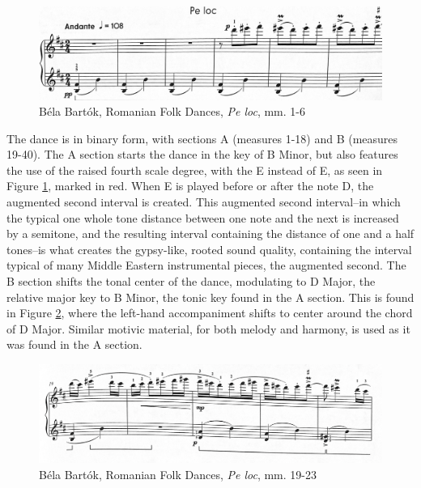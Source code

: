 \begin{figure}[h]
  \centering
  \includegraphics[width=\textwidth]{figures/bartok-one-spot-beginning.jpg}
  \caption{Béla Bartók, Romanian Folk Dances, \textit{Pe loc}, mm. 1-6}
  \label{fig:bartok-one-spot-beginning}
\end{figure}

The dance is in binary form, with sections A (measures 1-18) and B (measures 19-40). The A section starts the dance in the key of B Minor, but also features the use of the raised fourth scale degree, with the E\musSharp{} instead of E, as seen in Figure \ref{fig:bartok-one-spot-beginning}\autocite{Lung_2016}, marked in red. When E\musSharp{} is played before or after the note D, the augmented second interval is created. This augmented second interval--in which the typical one whole tone distance between one note and the next is increased by a semitone, and the resulting interval containing the distance of one and a half tones--is what creates the gypsy-like, rooted sound quality, containing the interval typical of many Middle Eastern instrumental pieces, the augmented second. The B section shifts the tonal center of the dance, modulating to D Major, the relative major key to B Minor, the tonic key found in the A section. This is found in Figure \ref{fig:bartok-one-spot-b-section}\autocite{Lung_2016}, where the left-hand accompaniment shifts to center around the chord of D Major. Similar motivic material, for both melody and harmony, is used as it was found in the A section.

\begin{figure}[h]
  \centering
  \includegraphics[width=\textwidth]{figures/bartok-one-spot-b-section.jpg}
  \caption{Béla Bartók, Romanian Folk Dances, \textit{Pe loc}, mm. 19-23}
  \label{fig:bartok-one-spot-b-section}
\end{figure}

